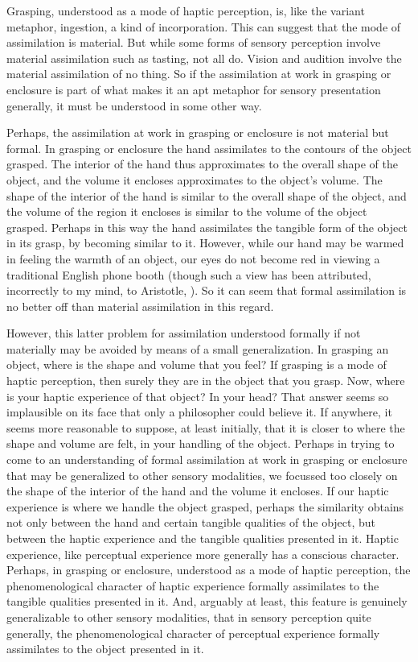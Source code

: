 \documentclass[12pt]{article}
\begin{document}
Grasping, understood as a mode of haptic perception, is, like the variant metaphor, ingestion, a kind of incorporation. This can suggest that the mode of assimilation is material. But while some forms of sensory perception involve material assimilation such as tasting, not all do. Vision and audition involve the material assimilation of no thing. So if the assimilation at work in grasping or enclosure is part of what makes it an apt metaphor for sensory presentation generally, it must be understood in some other way.

Perhaps, the assimilation at work in grasping or enclosure is not material but formal. In grasping or enclosure the hand assimilates to the contours of the object grasped. The interior of the hand thus approximates to the overall shape of the object, and the volume it encloses approximates to the object's volume. The shape of the interior of the hand is similar to the overall shape of the object, and the volume of the region it encloses is similar to the volume of the object grasped. Perhaps in this way the hand assimilates the tangible form of the object in its grasp, by becoming similar to it. However, while our hand may be warmed in feeling the warmth of an object, our eyes do not become red in viewing a traditional English phone booth (though such a view has been attributed, incorrectly to my mind, to Aristotle, \citealt{Slakey:1961ss, Sorabji:1974fk,Everson:1997ep}). So it can seem that formal assimilation is no better off than material assimilation in this regard.

However, this latter problem for assimilation understood formally if not materially may be avoided by means of a small generalization. In grasping an object, where is the shape and volume that you feel? If grasping is a mode of haptic perception, then surely they are in the object that you grasp. Now, where is your haptic experience of that object? In your head? That answer seems so implausible on its face that only a philosopher could believe it. If anywhere, it seems more reasonable to suppose, at least initially, that it is closer to where the shape and volume are felt, in your handling of the object. Perhaps in trying to come to an understanding of formal assimilation at work in grasping or enclosure that may be generalized to other sensory modalities, we focussed too closely on the shape of the interior of the hand and the volume it encloses. If our haptic experience is where we handle the object grasped, perhaps the similarity obtains not only between the hand and certain tangible qualities of the object, but between the haptic experience and the tangible qualities presented in it. Haptic experience, like perceptual experience more generally has a conscious character. Perhaps, in grasping or enclosure, understood as a mode of haptic perception, the phenomenological character of haptic experience formally assimilates to the tangible qualities presented in it. And, arguably at least, this feature is genuinely generalizable to other sensory modalities, that in sensory perception quite generally, the phenomenological character of perceptual experience formally assimilates to the object presented in it.
\end{document}
